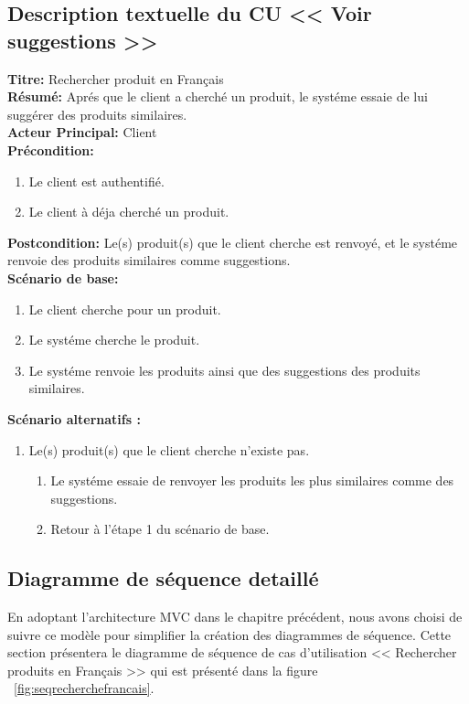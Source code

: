 \subsection{Description textuelle du CU << Voir suggestions >>}
\noindent
\textbf{Titre:} Rechercher produit en Français \\
\textbf{Résumé:} Aprés que le client a cherché un produit, le systéme essaie de lui suggérer des produits similaires. \\
\textbf{Acteur Principal:} Client \\
\textbf{Précondition:} \begin{enumerate}
	\item Le client est authentifié.
	\item Le client à déja cherché un produit.
\end{enumerate}
\textbf{Postcondition:} Le(s) produit(s) que le client cherche est renvoyé, et le systéme renvoie des produits similaires comme suggestions. \\
\textbf{Scénario de base: }
\begin{enumerate}
	\item Le client cherche pour un produit.
	\item Le systéme cherche le produit.
	\item Le systéme renvoie les produits ainsi que des suggestions des produits similaires.
\end{enumerate}

\newpage
\textbf{Scénario alternatifs : }
\begin{enumerate}
	\item Le(s) produit(s) que le client cherche n'existe pas.
	      \begin{enumerate}
		      \item Le systéme essaie de renvoyer les produits les plus similaires comme des suggestions.
		      \item Retour à l'étape 1 du scénario de base.
	      \end{enumerate}
\end{enumerate}

\subsection{Diagramme de séquence detaillé}
\noindent
En adoptant l'architecture MVC dans le chapitre précédent, nous avons choisi de
suivre ce modèle pour simplifier la création des diagrammes de séquence. Cette section
présentera le diagramme de séquence de cas d'utilisation << Rechercher produits en Français >> qui est présenté dans la figure ~\ref{fig:seqrecherchefrancais}.

